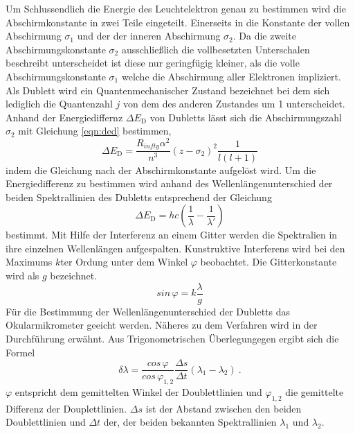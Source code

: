 Um Schlussendlich die Energie des Leuchtelektron genau zu bestimmen wird die Abschirmkonstante in zwei Teile eingeteilt. Einerseits in die Konstante der vollen Abschirmung $\sigma_1$ und der der inneren Abschirmung $\sigma_2$. Da die zweite Abschirmungskonstante $\sigma_2$ ausschließlich die vollbesetzten Unterschalen beschreibt unterscheidet ist diese nur geringfügig kleiner, als die volle Abschirmungskonstante $\sigma_1$ welche die Abschirmung aller Elektronen  impliziert. Als Dublett wird ein Quantenmechanischer Zustand bezeichnet bei dem sich lediglich die Quantenzahl $j$ von dem des anderen Zustandes um 1 unterscheidet. Anhand der Energiediffernz $\Delta E_\text{D}$ von Dubletts lässt sich die Abschirmungszahl $\sigma_2$ mit Gleichung \eqref{eqn:ded} bestimmen,
\begin{equation}
  \Delta E_\text{D} = \frac{R_{infty} \alpha^2}{n^3} \left( z - \sigma_2 \right)^2 \frac{1}{l(l+1)}
  \label{eqn:ded}
\end{equation}
indem die Gleichung nach der Abschirmkonstante aufgelöst wird. Um die Energiedifferenz zu bestimmen wird anhand des Wellenlängenunterschied der beiden Spektrallinien des Dubletts entsprechend der Gleichung
\begin{equation}
  \Delta E_\text{D} = hc\left( \frac{1}{\lambda} - \frac{1}{\lambda'} \right)
  \label{eqn:ed}
\end{equation}
bestimmt.
Mit Hilfe der Interferenz an einem Gitter werden die Spektralien in ihre einzelnen Wellenlängen aufgespalten. Kunstruktive Interferens wird bei den Maximums $k$ter Ordung unter dem Winkel $\varphi$ beobachtet. Die Gitterkonstante wird als $g$ bezeichnet.
\begin{equation}
  sin \, \varphi = k \frac{\lambda}{g}
  \label{eqn:phi}
\end{equation}
Für die Bestimmung der Wellenlängenunterschied der Dubletts das Okularmikrometer geeicht werden. Näheres zu dem Verfahren wird in der Durchführung erwähnt. Aus Trigonometrischen Überlegungegen ergibt sich die Formel
\begin{equation}
  \delta\lambda = \frac{cos \, \varphi}{cos \, \varphi_{1,2}} \frac{\Delta s}{\Delta t}\left( \lambda_1 - \lambda_2 \right) \ .
  \label{eqn:dlam}
\end{equation}
$\varphi$ entspricht dem gemittelten Winkel der Doublettlinien und $\varphi_{1,2}$ die gemittelte Differenz der Douplettlinien. $\Delta s$ ist der Abstand zwischen den beiden Doublettlinien und $\Delta t$ der, der beiden bekannten Spektrallinien $\lambda_1$ und $\lambda_2$.

